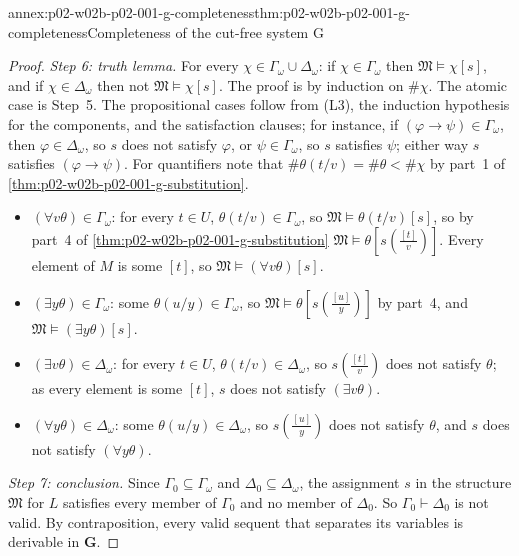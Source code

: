 \begin{annexitem}{annex:p02-w02b-p02-001-g-completeness}{thm:p02-w02b-p02-001-g-completeness}{Completeness of the cut-free system G}
\begin{proof}
\emph{Step 6: truth lemma.}  For every \(\chi\in\Gamma_\omega\cup\Delta_\omega\):
if \(\chi\in\Gamma_\omega\) then \(\mathfrak M\models\chi[s]\), and if
\(\chi\in\Delta_\omega\) then not \(\mathfrak M\models\chi[s]\).  The proof
is by induction on \(\#\chi\).  The atomic case is Step~5.  The
propositional cases follow from (L3), the induction hypothesis for the
components, and the satisfaction clauses; for instance, if
\((\varphi\to\psi)\in\Gamma_\omega\), then \(\varphi\in\Delta_\omega\), so
\(s\) does not satisfy \(\varphi\), or \(\psi\in\Gamma_\omega\), so \(s\)
satisfies \(\psi\); either way \(s\) satisfies \((\varphi\to\psi)\).  For
quantifiers note that \(\#\theta(t/v)=\#\theta<\#\chi\) by part~1 of
\cref{thm:p02-w02b-p02-001-g-substitution}.
\begin{itemize}
\item \((\forall v\theta)\in\Gamma_\omega\): for every \(t\in U\),
      \(\theta(t/v)\in\Gamma_\omega\), so \(\mathfrak M\models\theta(t/v)[s]\),
      so by part~4 of \cref{thm:p02-w02b-p02-001-g-substitution}
      \(\mathfrak M\models\theta[s(\tfrac{[t]}{v})]\).  Every element of
      \(M\) is some \([t]\), so \(\mathfrak M\models(\forall v\theta)[s]\).
\item \((\exists y\theta)\in\Gamma_\omega\): some
      \(\theta(u/y)\in\Gamma_\omega\), so
      \(\mathfrak M\models\theta[s(\tfrac{[u]}{y})]\) by part~4, and
      \(\mathfrak M\models(\exists y\theta)[s]\).
\item \((\exists v\theta)\in\Delta_\omega\): for every \(t\in U\),
      \(\theta(t/v)\in\Delta_\omega\), so \(s(\tfrac{[t]}{v})\) does not
      satisfy \(\theta\); as every element is some \([t]\),
      \(s\) does not satisfy \((\exists v\theta)\).
\item \((\forall y\theta)\in\Delta_\omega\): some
      \(\theta(u/y)\in\Delta_\omega\), so \(s(\tfrac{[u]}{y})\) does not
      satisfy \(\theta\), and \(s\) does not satisfy \((\forall y\theta)\).
\end{itemize}

\emph{Step 7: conclusion.}  Since \(\Gamma_0\subseteq\Gamma_\omega\) and
\(\Delta_0\subseteq\Delta_\omega\), the assignment \(s\) in the structure
\(\mathfrak M\) for \(L\) satisfies every member of \(\Gamma_0\) and no
member of \(\Delta_0\).  So \(\Gamma_0\vdash\Delta_0\) is not valid.  By
contraposition, every valid sequent that separates its variables is
derivable in \(\mathbf G\).
\end{proof}
\end{annexitem}

